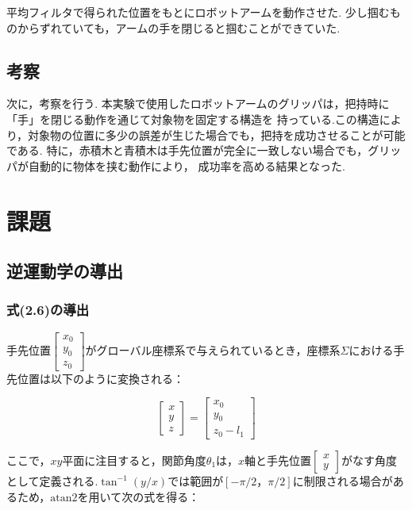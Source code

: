 平均フィルタで得られた位置をもとにロボットアームを動作させた.
少し掴むものからずれていても，アームの手を閉じると掴むことができていた.

\subsection{考察}
次に，考察を行う.
本実験で使用したロボットアームのグリッパは，把持時に「手」を閉じる動作を通じて対象物を固定する構造を
持っている.この構造により，対象物の位置に多少の誤差が生じた場合でも，把持を成功させることが可能である.
特に，赤積木と青積木は手先位置が完全に一致しない場合でも，グリッパが自動的に物体を挟む動作により，
成功率を高める結果となった.

\section{課題}

\subsection{逆運動学の導出}
\subsubsection{式(2.6)の導出}

手先位置$\begin{bmatrix} x_0 \\ y_0 \\ z_0 \end{bmatrix}$がグローバル座標系で与えられているとき，座標系$\Sigma$における手先位置は以下のように変換される：

\[
  \begin{bmatrix} x \\ y \\ z \end{bmatrix} = \begin{bmatrix} x_0 \\ y_0 \\ z_0 - l_1 \end{bmatrix} \tag{2.4}
\]

ここで，$xy$平面に注目すると，関節角度$\theta_1$は，$x$軸と手先位置$\begin{bmatrix} x \\ y \end{bmatrix}$がなす角度として定義される.$\tan^{-1}(y/x)$では範囲が$[-\pi/2， \pi/2]$に制限される場合があるため，$\text{atan2}$を用いて次の式を得る：

